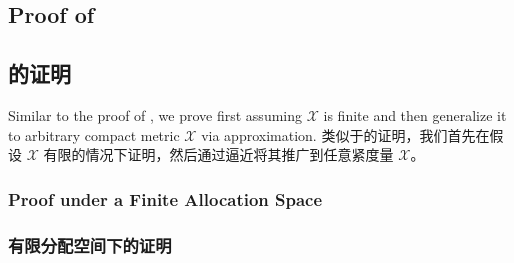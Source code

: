 \documentclass[12pt,letterpaper]{article}
\newenvironment{original}{\color{black}\noindent}{}
\newenvironment{translation}{\color{blue}\noindent}{}
\theoremstyle{plain}
\theoremstyle{definition}
\theoremstyle{remark}
\renewcommand{\1}{\mathds{1}}
\newcommand{\X}{\mathcal{X}}
\theoremstyle{definition}
\begin{document}
\begin{original}
\subsection{Proof of }
\end{original}
\begin{translation}
\subsection{的证明}
\end{translation}

\begin{original}
Similar to the proof of , we prove  first assuming $\X$ is finite and then generalize it to arbitrary compact metric $\X$ via approximation.
\end{original}
\begin{translation}
类似于的证明，我们首先在假设 $\X$ 有限的情况下证明，然后通过逼近将其推广到任意紧度量 $\X$。
\end{translation}

\begin{original}
\subsubsection{Proof under a Finite Allocation Space}
\end{original}
\begin{translation}
\subsubsection{有限分配空间下的证明}
\end{translation}
\end{document}
